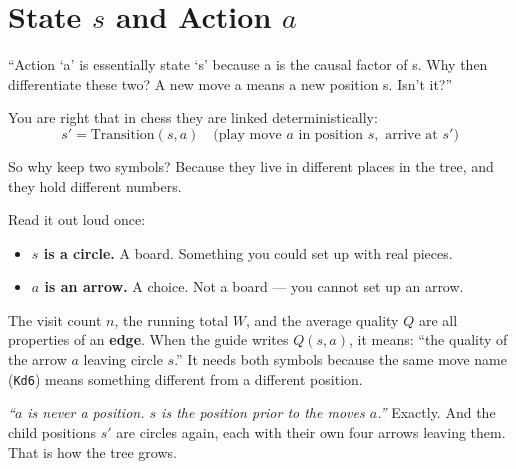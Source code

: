 \chapter{State $s$ and Action $a$}
\label{ch:states_actions}

\begin{studentq}
``Action `a' is essentially state `s' because a is the causal factor of s. Why then differentiate these two? A new move a means a new position s. Isn't it?''
\end{studentq}

You are right that in chess they are linked deterministically:
\begin{equation}
  s' = \text{Transition}(s, a) \quad \text{(play move } a \text{ in position } s, \text{ arrive at } s'\text{)}
\end{equation}

So why keep two symbols? Because they live in different places in the tree, and they hold different numbers.

\begin{center}

\label{fig:circles_arrows}
\end{center}

Read it out loud once:
\begin{itemize}[leftmargin=2em]
  \item \textbf{$s$ is a circle.} A board. Something you could set up with real pieces.
  \item \textbf{$a$ is an arrow.} A choice. Not a board --- you cannot set up an arrow.
\end{itemize}

\begin{established}
The visit count $n$, the running total $W$, and the average quality $Q$ are all properties of an \textbf{edge}. When the guide writes $Q(s, a)$, it means: ``the quality of the arrow $a$ leaving circle $s$.'' It needs both symbols because the same move name (\texttt{Kd6}) means something different from a different position.
\end{established}

\begin{keyidea}[title={Your Own Summary, Which Was Correct}]
\textit{``$a$ is never a position. $s$ is the position prior to the moves $a$.''} Exactly. And the child positions $s'$ are circles again, each with their own four arrows leaving them. That is how the tree grows.
\end{keyidea}
